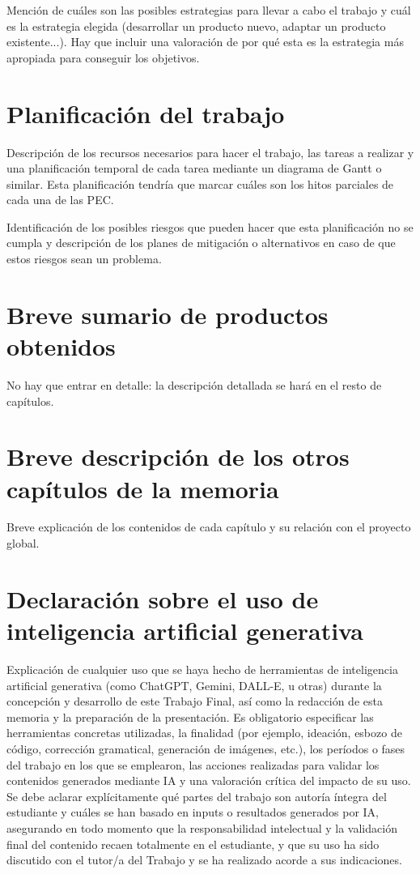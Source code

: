 \documentclass[IB]{TFUOC}%
\begin{document}
Mención de cuáles son las posibles estrategias para llevar a cabo el trabajo y cuál es la estrategia elegida (desarrollar un producto nuevo, adaptar un producto existente...). Hay que incluir una valoración de por qué esta es la estrategia más apropiada para conseguir los objetivos.   	



\section{Planificación del trabajo}

Descripción de los recursos necesarios para hacer el trabajo, las tareas a realizar y una planificación temporal de cada tarea mediante un diagrama de Gantt o similar. Esta planificación tendría que marcar cuáles son los hitos parciales de cada una de las PEC.

Identificación de los posibles riesgos que pueden hacer que esta planificación no se cumpla y descripción de los planes de mitigación o alternativos en caso de que estos riesgos sean un problema.

\section{Breve sumario de productos obtenidos}

No hay que entrar en detalle: la descripción detallada se hará en el resto de capítulos.


\section{Breve descripción de los otros capítulos de la memoria}

Breve explicación de los contenidos de cada capítulo y su relación con el proyecto global.

\section{Declaración sobre el uso de inteligencia artificial generativa}

Explicación de cualquier uso que se haya hecho de herramientas de inteligencia artificial generativa (como ChatGPT, Gemini, DALL-E, u otras) durante la concepción y desarrollo de este Trabajo Final, así como la redacción de esta memoria y la preparación de la presentación. Es obligatorio especificar las herramientas concretas utilizadas, la finalidad (por ejemplo, ideación, esbozo de código, corrección gramatical, generación de imágenes, etc.), los períodos o fases del trabajo en los que se emplearon, las acciones realizadas para validar los contenidos generados mediante IA y una valoración crítica del impacto de su uso. Se debe aclarar explícitamente qué partes del trabajo son autoría íntegra del estudiante y cuáles se han basado en inputs o resultados generados por IA, asegurando en todo momento que la responsabilidad intelectual y la validación final del contenido recaen totalmente en el estudiante, y que su uso ha sido discutido con el tutor/a del Trabajo y se ha realizado acorde a sus indicaciones. 
\end{document}
